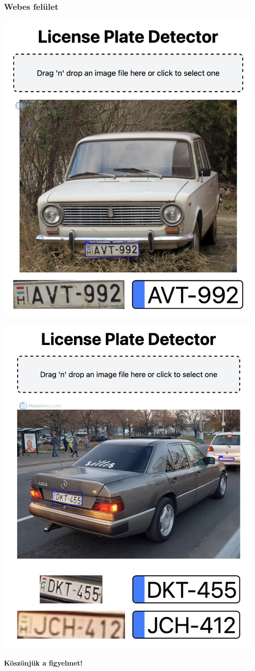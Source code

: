 \documentclass[aspectratio=169]{beamer}
\begin{document}
\begin{frame}
	\frametitle{Webes felület}

	\begin{minipage}{.5\textwidth}
		\centering
		\includegraphics[height=.8\textwidth]{images/web_single.png}
	\end{minipage}\begin{minipage}{.5\textwidth}
		\centering
		\includegraphics[height=.8\textwidth]{images/web_double.png}
	\end{minipage}
\end{frame}

\begin{frame}
	\Huge\bfseries
	\centering
	Köszönjük a figyelmet!
\end{frame}
\end{document}
